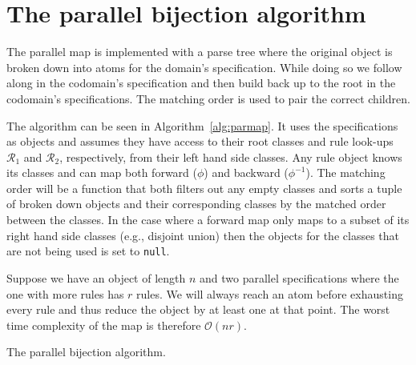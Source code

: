 \section{The parallel bijection algorithm}
The parallel map is implemented with a parse tree where the original object is broken down into atoms for the domain's specification. While doing so we follow along in the codomain's specification and then build back up to the root in the codomain's specifications. The matching order is used to pair the correct children.

The algorithm can be seen in Algorithm~\ref{alg:parmap}. It uses the specifications as objects and assumes they have access to their root classes and rule look-ups $\mathscr{R}_1$ and $\mathscr{R}_2$, respectively, from their left hand side classes. Any rule object knows its classes and can map both forward ($\phi$) and backward ($\phi^{-1}$). The matching order will be a function that both filters out any empty classes and sorts a tuple of broken down objects and their corresponding classes by the matched order between the classes. In the case where a forward map only maps to a subset of its right hand side classes (e.g., disjoint union) then the objects for the classes that are not being used is set to \texttt{null}.

Suppose we have an object of length $n$ and two parallel specifications where the one with more rules has $r$ rules. We will always reach an atom before exhausting every rule and thus reduce the object by at least one at that point. The worst time complexity of the map is therefore $\mathcal{O}(nr)$.

\begin{algorithm}[ht!]

\caption{The parallel bijection algorithm.}
\label{alg:parmap}
\end{algorithm}